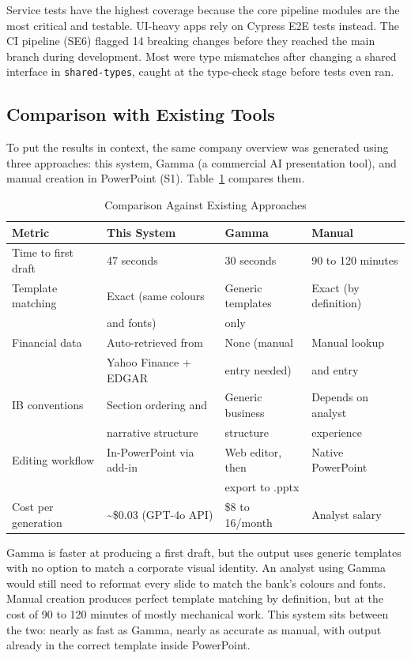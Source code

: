 Service tests have the highest coverage because the core pipeline modules are the most critical and testable. UI-heavy apps rely on Cypress E2E tests instead. The CI pipeline (SE6) flagged 14 breaking changes before they reached the main branch during development. Most were type mismatches after changing a shared interface in \texttt{shared-types}, caught at the type-check stage before tests even ran.

\subsection{Comparison with Existing Tools}

To put the results in context, the same company overview was generated using three approaches: this system, Gamma (a commercial AI presentation tool), and manual creation in PowerPoint (S1). Table~\ref{tab:comparison} compares them.

\begin{table}[H]
\centering
\begin{tabular}{|l|l|l|l|}
\hline
\rowcolor{gray!20} \textbf{Metric} & \textbf{This System} & \textbf{Gamma} & \textbf{Manual} \\
\hline
Time to first draft & 47 seconds & 30 seconds & 90 to 120 minutes \\
\hline
Template matching & Exact (same colours & Generic templates & Exact (by definition) \\
 & and fonts) & only & \\
\hline
Financial data & Auto-retrieved from & None (manual & Manual lookup \\
 & Yahoo Finance + EDGAR & entry needed) & and entry \\
\hline
IB conventions & Section ordering and & Generic business & Depends on analyst \\
 & narrative structure & structure & experience \\
\hline
Editing workflow & In-PowerPoint via add-in & Web editor, then & Native PowerPoint \\
 & & export to .pptx & \\
\hline
Cost per generation & \textasciitilde\$0.03 (GPT-4o API) & \$8 to 16/month & Analyst salary \\
\hline
\end{tabular}
\caption{Comparison Against Existing Approaches}
\label{tab:comparison}
\end{table}

Gamma is faster at producing a first draft, but the output uses generic templates with no option to match a corporate visual identity. An analyst using Gamma would still need to reformat every slide to match the bank's colours and fonts. Manual creation produces perfect template matching by definition, but at the cost of 90 to 120 minutes of mostly mechanical work. This system sits between the two: nearly as fast as Gamma, nearly as accurate as manual, with output already in the correct template inside PowerPoint.

